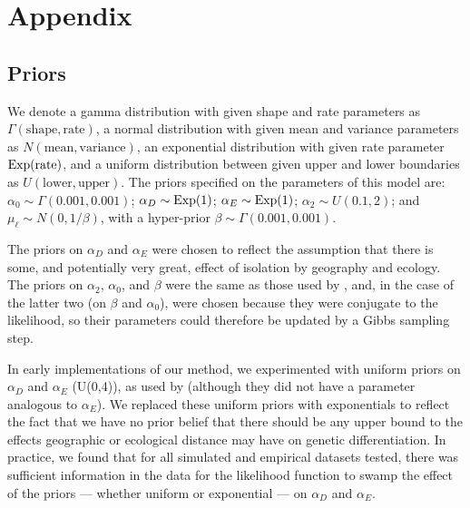 \clearpage
\section*{Appendix}
\subsection*{Priors}
We denote a gamma distribution with given shape and rate parameters as $\Gamma(\mbox{shape},\mbox{rate})$, a normal distribution with given mean and variance parameters as $N(\mbox{mean},\mbox{variance})$, an exponential distribution with given rate parameter $\mathop{\mbox{Exp}}(\mbox{rate})$, and a uniform distribution between given upper and lower boundaries as $U(\mbox{lower},\mbox{upper})$.  The priors specified on the parameters of this model are: $\alpha_{0} \sim \Gamma(0.001,0.001)$; $\alpha_{D} \sim \mathop{\mbox{Exp}}(1)$; $\alpha_{E} \sim \mathop{\mbox{Exp}}(1)$; $\alpha_{2} \sim U(0.1,2)$; and $\mu_{\ell} \sim N(0,1/\beta)$, with a hyper-prior $\beta \sim \Gamma(0.001,0.001)$.

The priors on $\alpha_D$ and $\alpha_E$ were chosen to reflect the assumption that there is some, and potentially very great, effect of isolation by geography and ecology.  The priors on $\alpha_2$, $\alpha_0$, and $\beta$ were the same as those used by \citep{Wasser2004}, and, in the case of the latter two (on $\beta$ and $\alpha_0$), were chosen because they were conjugate to the likelihood, so their parameters could therefore be updated by a Gibbs sampling step.  

In early implementations of our method, we experimented with uniform priors on  $\alpha_D$ and $\alpha_E$ (U(0,4)), as used by \citet{Wasser2004} (although they did not have a parameter analogous to $\alpha_E$).  We replaced these uniform priors with exponentials to reflect the fact that we have no prior belief that there should be any upper bound to the effects geographic or ecological distance may have on genetic differentiation.  In practice, we found that for all simulated and empirical datasets tested, there was sufficient information in the data for the likelihood function to swamp the effect of the priors --- whether uniform or exponential --- on $\alpha_D$ and $\alpha_E$.    

